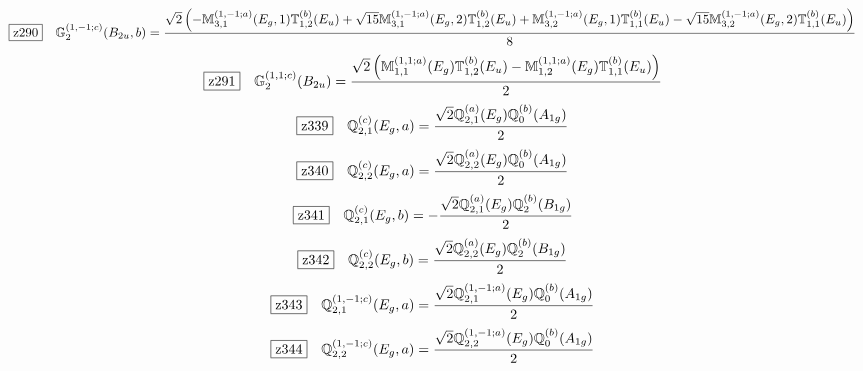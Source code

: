 \documentclass[fleqn,10pt,landscape]{jsarticle}
\begin{document}
\begin{dmath*}
\hspace*{3mm}\fbox{z290}\quad \mathbb{G}_{2}^{(1,-1;c)}(B_{2u},b)=\frac{\sqrt{2} \left(- \mathbb{M}_{3,1}^{(1,-1;a)}(E_{g},1) \mathbb{T}_{1,2}^{(b)}(E_{u}) + \sqrt{15} \mathbb{M}_{3,1}^{(1,-1;a)}(E_{g},2) \mathbb{T}_{1,2}^{(b)}(E_{u}) + \mathbb{M}_{3,2}^{(1,-1;a)}(E_{g},1) \mathbb{T}_{1,1}^{(b)}(E_{u}) - \sqrt{15} \mathbb{M}_{3,2}^{(1,-1;a)}(E_{g},2) \mathbb{T}_{1,1}^{(b)}(E_{u})\right)}{8}
\end{dmath*}
\begin{dmath*}
\hspace*{3mm}\fbox{z291}\quad \mathbb{G}_{2}^{(1,1;c)}(B_{2u})=\frac{\sqrt{2} \left(\mathbb{M}_{1,1}^{(1,1;a)}(E_{g}) \mathbb{T}_{1,2}^{(b)}(E_{u}) - \mathbb{M}_{1,2}^{(1,1;a)}(E_{g}) \mathbb{T}_{1,1}^{(b)}(E_{u})\right)}{2}
\end{dmath*}
\begin{dmath*}
\hspace*{3mm}\fbox{z339}\quad \mathbb{Q}_{2,1}^{(c)}(E_{g},a)=\frac{\sqrt{2} \mathbb{Q}_{2,1}^{(a)}(E_{g}) \mathbb{Q}_{0}^{(b)}(A_{1g})}{2}
\end{dmath*}
\begin{dmath*}
\hspace*{3mm}\fbox{z340}\quad \mathbb{Q}_{2,2}^{(c)}(E_{g},a)=\frac{\sqrt{2} \mathbb{Q}_{2,2}^{(a)}(E_{g}) \mathbb{Q}_{0}^{(b)}(A_{1g})}{2}
\end{dmath*}
\begin{dmath*}
\hspace*{3mm}\fbox{z341}\quad \mathbb{Q}_{2,1}^{(c)}(E_{g},b)=- \frac{\sqrt{2} \mathbb{Q}_{2,1}^{(a)}(E_{g}) \mathbb{Q}_{2}^{(b)}(B_{1g})}{2}
\end{dmath*}
\begin{dmath*}
\hspace*{3mm}\fbox{z342}\quad \mathbb{Q}_{2,2}^{(c)}(E_{g},b)=\frac{\sqrt{2} \mathbb{Q}_{2,2}^{(a)}(E_{g}) \mathbb{Q}_{2}^{(b)}(B_{1g})}{2}
\end{dmath*}
\begin{dmath*}
\hspace*{3mm}\fbox{z343}\quad \mathbb{Q}_{2,1}^{(1,-1;c)}(E_{g},a)=\frac{\sqrt{2} \mathbb{Q}_{2,1}^{(1,-1;a)}(E_{g}) \mathbb{Q}_{0}^{(b)}(A_{1g})}{2}
\end{dmath*}
\begin{dmath*}
\hspace*{3mm}\fbox{z344}\quad \mathbb{Q}_{2,2}^{(1,-1;c)}(E_{g},a)=\frac{\sqrt{2} \mathbb{Q}_{2,2}^{(1,-1;a)}(E_{g}) \mathbb{Q}_{0}^{(b)}(A_{1g})}{2}
\end{dmath*}
\end{document}
